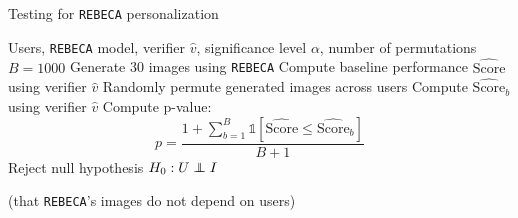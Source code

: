 \begin{algorithm}[tb]
   \caption{Testing for \texttt{REBECA} personalization}
   \label{alg:perf-eval}
\begin{algorithmic}
    Users, \texttt{REBECA} model, verifier $\hat{v}$, significance level $\alpha$, number of permutations $B=1000$
   \STATE Generate 30 images using \texttt{REBECA}
   \ENDFOR
   \STATE Compute baseline performance $\widehat{\text{Score}}$ using verifier $\hat{v}$
   \STATE Randomly permute generated images across users
   \STATE Compute $\widehat{\text{Score}}_b$ using verifier $\hat{v}$
   \ENDFOR
   \STATE Compute p-value: $$p=\frac{1+\sum_{b=1}^B \mathds{1}\left[\widehat{\text{Score}}\leq \widehat{\text{Score}}_b\right]}{B+1}$$
   \STATE Reject null hypothesis $H_0:U\perp\!\!\!\!\perp I$ 
   
   (that \texttt{REBECA}'s images do not depend on users)
   \ENDIF
\end{algorithmic}
\end{algorithm}